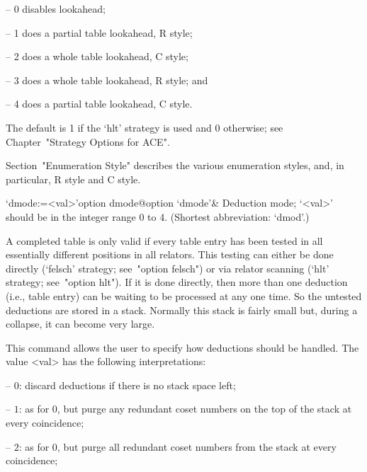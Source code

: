 \beginlist%

\item{--} 0 disables lookahead;
\item{--} 1 does a partial table lookahead, R style; 
\item{--} 2 does a whole table lookahead, C style; 
\item{--} 3 does a whole table lookahead, R style; and
\item{--} 4 does a partial table lookahead, C style.  

\endlist

The default is 1 if the `hlt' strategy is used and  0  otherwise;  see
Chapter~"Strategy Options for ACE".

Section~"Enumeration Style" describes the various enumeration  styles,
and, in particular, R style and C style.

\enditems


\beginitems

\>`dmode:=<val>'{option dmode}@{option `dmode'}&
Deduction mode; `<val>' should be in the integer range 0 to 4.
(Shortest abbreviation: `dmod'.)

A completed table  is only valid if every table  entry has been tested
in all essentially different  positions in all relators.  This testing
can either be done directly (`felsch' strategy;  see~"option  felsch")
or via relator scanning (`hlt' strategy; see~"option hlt"). If  it  is
done directly, then more than one deduction (i.e., table entry) can be
waiting to be processed at any one time. So  the  untested  deductions
are stored in a stack. Normally this stack is fairly small but, during
a collapse, it can become very large.

This command allows the user  to  specify  how  deductions  should  be
handled. The value <val> has the following interpretations:

\beginlist%

\item{--} $0$:  
discard deductions if there is no stack space left;

\item{--} $1$: 
as for $0$, but purge any redundant coset numbers on the  top  of  the
stack at every coincidence;

\item{--} $2$: 
as for 0, but purge all redundant coset  numbers  from  the  stack  at
every coincidence;


